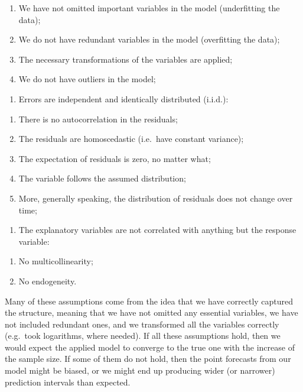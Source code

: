 \documentclass[]{book}
\providecommand{\tightlist}{%
  \setlength{\itemsep}{0pt}\setlength{\parskip}{0pt}}
\theoremstyle{definition}
\theoremstyle{definition}
\theoremstyle{definition}
\theoremstyle{definition}
\theoremstyle{remark}
\begin{document}
\begin{enumerate}
\def\labelenumi{\alph{enumi}.}
\tightlist
\item
  We have not omitted important variables in the model (underfitting the data);
\item
  We do not have redundant variables in the model (overfitting the data);
\item
  The necessary transformations of the variables are applied;
\item
  We do not have outliers in the model;
\end{enumerate}

\begin{enumerate}
\def\labelenumi{\arabic{enumi}.}
\setcounter{enumi}{1}
\tightlist
\item
  Errors are independent and identically distributed (i.i.d.):
\end{enumerate}

\begin{enumerate}
\def\labelenumi{\alph{enumi}.}
\tightlist
\item
  There is no autocorrelation in the residuals;
\item
  The residuals are homoscedastic (i.e.~have constant variance);
\item
  The expectation of residuals is zero, no matter what;
\item
  The variable follows the assumed distribution;
\item
  More, generally speaking, the distribution of residuals does not change over time;
\end{enumerate}

\begin{enumerate}
\def\labelenumi{\arabic{enumi}.}
\setcounter{enumi}{2}
\tightlist
\item
  The explanatory variables are not correlated with anything but the response variable:
\end{enumerate}

\begin{enumerate}
\def\labelenumi{\alph{enumi}.}
\tightlist
\item
  No multicollinearity;
\item
  No endogeneity.
\end{enumerate}

Many of these assumptions come from the idea that we have correctly captured the structure, meaning that we have not omitted any essential variables, we have not included redundant ones, and we transformed all the variables correctly (e.g.~took logarithms, where needed). If all these assumptions hold, then we would expect the applied model to converge to the true one with the increase of the sample size. If some of them do not hold, then the point forecasts from our model might be biased, or we might end up producing wider (or narrower) prediction intervals than expected.
\end{document}
